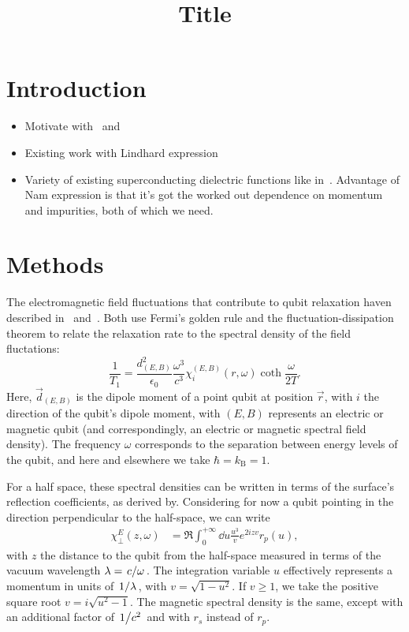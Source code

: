 \documentclass{article}
\title{Title}
\begin{document}
\maketitle

\section{Introduction \label{sec:intro}}
\begin{itemize}
	\item Motivate with~\cite{Tenberg2019} and~\cite{Kolkowitz2015}
	\item Existing work with Lindhard expression~\cite{QubitRelax}
	\item Variety of existing superconducting dielectric functions like in~\cite{AGD, llv9, Zimmermann1991, Mattis, Tinkham}.
	Advantage of Nam expression\cite{Nam1967} is that it's got the worked out dependence on momentum and impurities, both of which we need.
\end{itemize}
\section{Methods \label{sec:methods}}

The electromagnetic field fluctuations that contribute to qubit relaxation haven described in~\cite{QubitRelax} and~\cite{Henkel1999}.
Both use Fermi's golden rule and the fluctuation-dissipation theorem to relate the relaxation rate to the spectral density of the field fluctations:
\begin{equation}
	\frac{1}{T_1} = \frac{d_{(E,B)}^2}{\epsilon_0} \frac{\omega^3}{c^3} \chi_{i}^{(E,B)}(r, \omega) \coth\frac{\omega}{2 T}.
\end{equation}
Here, $\vec{d}_{(E,B)}$ is the dipole moment of a point qubit at position $\vec{r}$, with $i$ the direction of the qubit's dipole moment, with $(E,B)$ represents an electric or magnetic qubit (and correspondingly, an electric or magnetic spectral field density).
The frequency $\omega$ corresponds to the separation between energy levels of the qubit, and here and elsewhere we take $\hbar = k_{\mathrm{B}} = 1$.

For a half space, these spectral densities can be written in terms of the surface's reflection coefficients, as derived by\cite{Henkel1999}.
Considering for now a qubit pointing in the direction perpendicular to the half-space, we can write
\begin{align}
	\chi_\perp^E(z, \omega) &= \Re \int_0^{+\infty} \dd{u} \frac{u^3}{v} e^{2 i z v} r_p(u), \label{eq:chi}
\end{align}
with $z$ the distance to the qubit from the half-space measured in terms of the vacuum wavelength $\lambda = \flatfrac{c}{\omega}$.
The integration variable $u$ effectively represents a momentum in units of $\flatfrac{1}{\lambda}$, with $v = \sqrt{1 - u^2}$.
If $v \geq 1$, we take the positive square root $v = i \sqrt{u^2 - 1}$.
The magnetic spectral density is the same, except with an additional factor of $\flatfrac{1}{c^2}$ and with $r_s$ instead of $r_p$.
\end{document}
